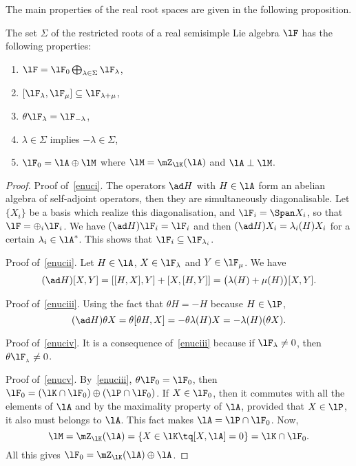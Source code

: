 The main properties of the real root spaces are given in the following proposition.

\begin{proposition}     \label{PropPropRacincesReelles}
The set $\Sigma$ of the restricted roots of a real semisimple Lie algebra $\lF$ has the following properties:
\label{prop:enuc}
\begin{enumerate}
\item\label{enuci} $\lF=\lF_0\bigoplus_{\lambda\in\Sigma}\lF_{\lambda}$,
\item\label{enucii} $[\lF_{\lambda},\lF_{\mu}]\subseteq\lF_{\lambda+\mu}$,
\item\label{enuciii} $\theta\lF_{\lambda}=\lF_{-\lambda}$,
\item\label{enuciv} $\lambda\in\Sigma$ implies $-\lambda\in\Sigma$,
\item\label{enucv} $\lF_0=\lA\oplus\lM$ where $\lM=\mZ_{\lK}(\lA)$ and $\lA\perp\lM$.
\end{enumerate}
\end{proposition}

\begin{proof}
Proof of~\ref{enuci}. The operators $\ad H$ with $H\in\lA$ form an abelian algebra of self-adjoint operators, then they are simultaneously diagonalisable. Let $\{X_i\}$ be a basis which realize this diagonalisation, and $\lF_i=\Span X_i$, so that $\lF=\oplus_i\lF_i$. We have $(\ad H)\lF_i=\lF_i$ and then $(\ad H)X_i=\lambda_i(H)X_i$ for a certain $\lambda_i\in\lA^*$. This shows that $\lF_i\subseteq\lF_{\lambda_i}$.

Proof of~\ref{enucii}. Let $H\in\lA$, $X\in\lF_{\lambda}$ and $Y\in\lF_{\mu}$. We have
\begin{equation}
   (\ad H)[X,Y]=[[H,X],Y]+[X,[H,Y]]
               =\big(  \lambda(H)+\mu(H) \big) [X,Y].
\end{equation}

Proof of~\ref{enuciii}. Using the fact that $\theta H=-H$ because $H\in\lP$,
\begin{equation}
  (\ad H)\theta X=\theta[\theta H,X]
                 =-\theta\lambda(H)X
         =-\lambda(H)(\theta X).
\end{equation}

Proof of~\ref{enuciv}. It is a consequence of~\ref{enuciii} because if $\lF_{\lambda}\neq 0$, then $\theta\lF_{_{\lambda}}\neq 0$.

Proof of~\ref{enucv}. By~\ref{enuciii}, $\theta\lF_0=\lF_0$, then $\lF_0=(\lK\cap\lF_0)\oplus(\lP\cap\lF_0)$. If $X\in\lF_0$, then it commutes with all the elements of $\lA$ and by the maximality property of $\lA$, provided that $X\in\lP$, it also must belongs to $\lA$. This fact makes $\lA=\lP\cap\lF_0$. Now,
\[
  \lM=\mZ_{\lK}(\lA)=\{X\in\lK\tq [X,\lA]=0\}=\lK\cap\lF_0.
\]
All this gives $\lF_0=\mZ_{\lK}(\lA)\oplus\lA$.
\end{proof}

